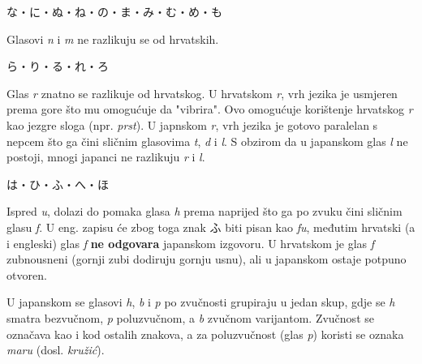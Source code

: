 	\vspace{5pt}
	\noindent\ten な・に・ぬ・ね・の・ま・み・む・め・も
	
	Glasovi \textit{n} i \textit{m} ne razlikuju se od hrvatskih.
	
	\vspace{5pt}
	\noindent\ten ら・り・る・れ・ろ
	
	Glas \textit{r} znatno se razlikuje od hrvatskog. U hrvatskom \textit{r}, vrh jezika je usmjeren prema gore što mu omogućuje da "vibrira". Ovo omogućuje korištenje hrvatskog \textit{r} kao jezgre sloga (npr. \textit{prst}). U japnskom \textit{r}, vrh jezika je gotovo paralelan s nepcem što ga čini sličnim glasovima \textit{t}, \textit{d} i \textit{l}. S obzirom da u japanskom glas \textit{l} ne postoji, mnogi japanci ne razlikuju \textit{r} i \textit{l}.
	
	\vspace{5pt}
	\noindent\ten は・ひ・ふ・へ・ほ
	
	Ispred \textit{u}, dolazi do pomaka glasa \textit{h} prema naprijed što ga po zvuku čini sličnim glasu \textit{f}. U eng. zapisu će zbog toga znak ふ biti pisan kao \textit{fu}, međutim hrvatski (a i engleski) glas \textit{f} \textbf{ne odgovara} japanskom izgovoru. U hrvatskom je glas \textit{f} zubnousneni (gornji zubi dodiruju gornju usnu), ali u japanskom ostaje potpuno otvoren.
	
	U japanskom se glasovi \textit{h}, \textit{b} i \textit{p} po zvučnosti grupiraju u jedan skup, gdje se \textit{h} smatra bezvučnom, \textit{p} poluzvučnom\footnotemark[1], a \textit{b} zvučnom varijantom. Zvučnost se označava kao i kod ostalih znakova, a za poluzvučnost (glas \textit{p}) koristi se oznaka \textit{maru} (dosl. \textit{kružić}).
	
